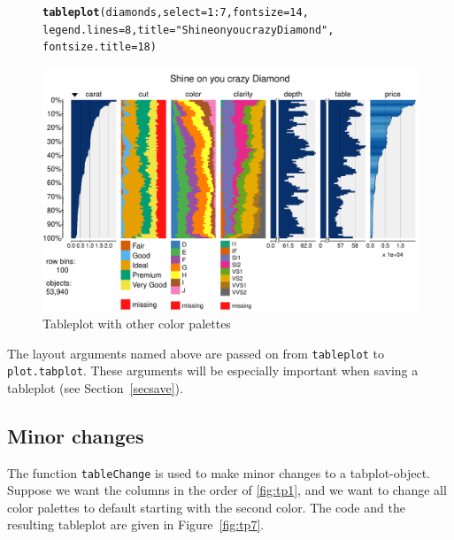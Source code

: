 \documentclass[11pt, fleqn, a4paper]{article}\usepackage[]{graphicx}\usepackage[]{color}
\makeatletter
\def\maxwidth{ %
  \ifdim\Gin@nat@width>\linewidth
    \linewidth
  \else
    \Gin@nat@width
  \fi
}
\newcommand{\hlnum}[1]{\textcolor[rgb]{0.686,0.059,0.569}{#1}}%
\newcommand{\hlstr}[1]{\textcolor[rgb]{0.192,0.494,0.8}{#1}}%
\newcommand{\hlopt}[1]{\textcolor[rgb]{0,0,0}{#1}}%
\newcommand{\hlstd}[1]{\textcolor[rgb]{0.345,0.345,0.345}{#1}}%
\newcommand{\hlkwc}[1]{\textcolor[rgb]{0.333,0.667,0.333}{#1}}%
\newcommand{\hlkwd}[1]{\textcolor[rgb]{0.737,0.353,0.396}{\textbf{#1}}}%
\newenvironment{kframe}{%
 \def\at@end@of@kframe{}%
 \ifinner\ifhmode%
  \def\at@end@of@kframe{\end{minipage}}%
  \begin{minipage}{\columnwidth}%
 \fi\fi%
 \def\FrameCommand##1{\hskip\@totalleftmargin \hskip-\fboxsep
 \colorbox{shadecolor}{##1}\hskip-\fboxsep
     \hskip-\linewidth \hskip-\@totalleftmargin \hskip\columnwidth}%
 \MakeFramed {\advance\hsize-\width
   \@totalleftmargin\z@ \linewidth\hsize
   \@setminipage}}%
 {\par\unskip\endMakeFramed%
 \at@end@of@kframe}
\newenvironment{knitrout}{}{} %
\makeatother
\begin{document}
\begin{figure}[htp]
\begin{knitrout}
\color{fgcolor}\begin{kframe}
\begin{alltt}
\hlkwd{tableplot}\hlstd{(diamonds,} \hlkwc{select} \hlstd{=} \hlnum{1}\hlopt{:}\hlnum{7}\hlstd{,} \hlkwc{fontsize} \hlstd{=} \hlnum{14}\hlstd{,}
    \hlkwc{legend.lines} \hlstd{=} \hlnum{8}\hlstd{,} \hlkwc{title} \hlstd{=} \hlstr{"Shine on you crazy Diamond"}\hlstd{,}
    \hlkwc{fontsize.title} \hlstd{=} \hlnum{18}\hlstd{)}
\end{alltt}
\end{kframe}
\includegraphics[width=\maxwidth]{figure/chunk10} 

\end{knitrout}

\caption{Tableplot with other color palettes}
\label{fig:tp6}
\end{figure}

The layout arguments named above are passed on from {\tt tableplot} to {\tt plot.tabplot}. These arguments will be especially important when saving a tableplot (see Section~\ref{secsave}).



\subsection{Minor changes}

The function {\tt tableChange} is used to make minor changes to a tabplot-object. Suppose we want the columns in the order of \ref{fig:tp1}, and we want to change all color palettes to default starting with the second color. The code and the resulting tableplot are given in Figure~\ref{fig:tp7}.
\end{document}

